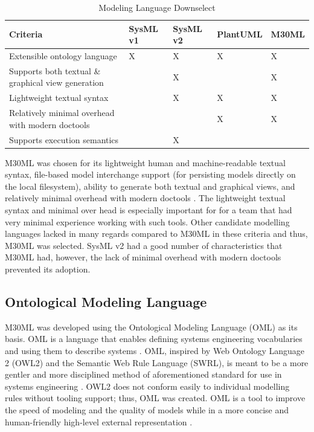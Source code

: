 \documentclass[journal,article,submit,pdftex,moreauthors]{Definitions/mdpi}
\begin{document}
\begin{table}[H] 
	\caption{Modeling Language Downselect}
	\label{tab:language}
	\begin{tabularx}{\textwidth}{CCCCC}
	\toprule
	\textbf{Criteria}  & \textbf{SysML v1}  & \textbf{SysML v2}  & \textbf{PlantUML}  & \textbf{M30ML}\\
	\midrule
	Extensible ontology language                       & X        & X        & X        & X     \\ \hline
	Supports both textual \& graphical view generation &          & X        &          & X     \\ \hline
	Lightweight textual syntax                         &          & X        & X        & X     \\ \hline
	Relatively minimal overhead with modern doctools   &          &          & X        & X     \\ \hline
	Supports execution semantics                       &          & X        &          &       \\
	\bottomrule
	\end{tabularx}
\end{table}

M30ML was chosen for its lightweight human and machine-readable textual syntax, file-based model interchange support (for persisting models directly on the local filesystem), ability to generate both textual and graphical views, and relatively minimal overhead with modern doctools \cite{mach30_git}.  The lightweight textual syntax and minimal over head is especially important for for a team that had very minimal experience working with such tools.  Other candidate modelling languages lacked in many regards compared to M30ML in these criteria and thus, M30ML was selected.  SysML v2 had a good number of characteristics that M30ML had, however, the lack of minimal overhead with modern doctools prevented its adoption.  

\subsection{Ontological Modeling Language}
M30ML was developed using the Ontological Modeling Language (OML) as its basis.  OML is a language that enables defining systems engineering vocabularies and using them to describe systems \cite{oml_language}.  OML, inspired by Web Ontology Language 2 (OWL2) and the Semantic Web Rule Language (SWRL), is meant to be a more gentler and more disciplined method of aforementioned standard for use in systems engineering \cite{oml_language}.  OWL2 does not conform easily to individual modelling rules without tooling support; thus, OML was created.  OML is a tool to improve the speed of modeling and the quality of models while in a more concise and human-friendly high-level external representation \cite{oml_origin_and_rationale}. 
\end{document}
